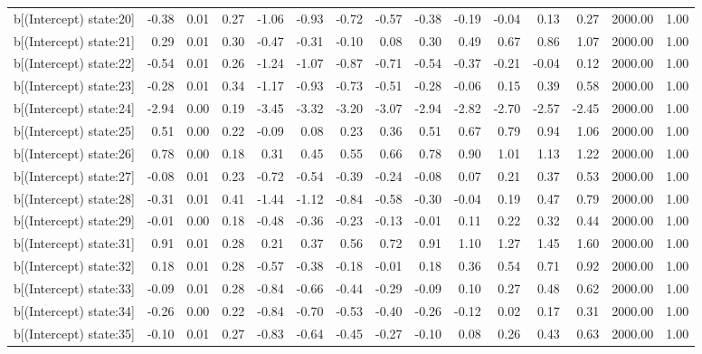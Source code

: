 \begin{table}[ht]
\begin{tabular}{rrrrrrrrrrrrrrr}
  b[(Intercept) state:20] & -0.38 & 0.01 & 0.27 & -1.06 & -0.93 & -0.72 & -0.57 & -0.38 & -0.19 & -0.04 & 0.13 & 0.27 & 2000.00 & 1.00 \\ 
  b[(Intercept) state:21] & 0.29 & 0.01 & 0.30 & -0.47 & -0.31 & -0.10 & 0.08 & 0.30 & 0.49 & 0.67 & 0.86 & 1.07 & 2000.00 & 1.00 \\ 
  b[(Intercept) state:22] & -0.54 & 0.01 & 0.26 & -1.24 & -1.07 & -0.87 & -0.71 & -0.54 & -0.37 & -0.21 & -0.04 & 0.12 & 2000.00 & 1.00 \\ 
  b[(Intercept) state:23] & -0.28 & 0.01 & 0.34 & -1.17 & -0.93 & -0.73 & -0.51 & -0.28 & -0.06 & 0.15 & 0.39 & 0.58 & 2000.00 & 1.00 \\ 
  b[(Intercept) state:24] & -2.94 & 0.00 & 0.19 & -3.45 & -3.32 & -3.20 & -3.07 & -2.94 & -2.82 & -2.70 & -2.57 & -2.45 & 2000.00 & 1.00 \\ 
  b[(Intercept) state:25] & 0.51 & 0.00 & 0.22 & -0.09 & 0.08 & 0.23 & 0.36 & 0.51 & 0.67 & 0.79 & 0.94 & 1.06 & 2000.00 & 1.00 \\ 
  b[(Intercept) state:26] & 0.78 & 0.00 & 0.18 & 0.31 & 0.45 & 0.55 & 0.66 & 0.78 & 0.90 & 1.01 & 1.13 & 1.22 & 2000.00 & 1.00 \\ 
  b[(Intercept) state:27] & -0.08 & 0.01 & 0.23 & -0.72 & -0.54 & -0.39 & -0.24 & -0.08 & 0.07 & 0.21 & 0.37 & 0.53 & 2000.00 & 1.00 \\ 
  b[(Intercept) state:28] & -0.31 & 0.01 & 0.41 & -1.44 & -1.12 & -0.84 & -0.58 & -0.30 & -0.04 & 0.19 & 0.47 & 0.79 & 2000.00 & 1.00 \\ 
  b[(Intercept) state:29] & -0.01 & 0.00 & 0.18 & -0.48 & -0.36 & -0.23 & -0.13 & -0.01 & 0.11 & 0.22 & 0.32 & 0.44 & 2000.00 & 1.00 \\ 
  b[(Intercept) state:31] & 0.91 & 0.01 & 0.28 & 0.21 & 0.37 & 0.56 & 0.72 & 0.91 & 1.10 & 1.27 & 1.45 & 1.60 & 2000.00 & 1.00 \\ 
  b[(Intercept) state:32] & 0.18 & 0.01 & 0.28 & -0.57 & -0.38 & -0.18 & -0.01 & 0.18 & 0.36 & 0.54 & 0.71 & 0.92 & 2000.00 & 1.00 \\ 
  b[(Intercept) state:33] & -0.09 & 0.01 & 0.28 & -0.84 & -0.66 & -0.44 & -0.29 & -0.09 & 0.10 & 0.27 & 0.48 & 0.62 & 2000.00 & 1.00 \\ 
  b[(Intercept) state:34] & -0.26 & 0.00 & 0.22 & -0.84 & -0.70 & -0.53 & -0.40 & -0.26 & -0.12 & 0.02 & 0.17 & 0.31 & 2000.00 & 1.00 \\ 
  b[(Intercept) state:35] & -0.10 & 0.01 & 0.27 & -0.83 & -0.64 & -0.45 & -0.27 & -0.10 & 0.08 & 0.26 & 0.43 & 0.63 & 2000.00 & 1.00 \\ 

\end{tabular}
\end{table}
